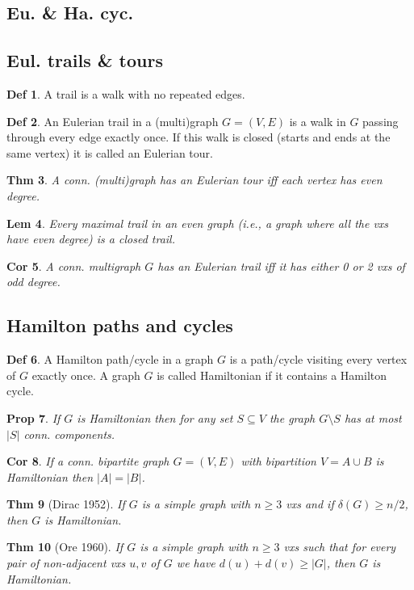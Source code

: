 \documentclass[11pt, fleqn, a4paper, landscape]{article}
\theoremstyle{plain} %
\newtheorem{thm}{Thm}
\newtheorem{lem}[thm]{Lem}
\newtheorem{pro}[thm]{Prop}
\newtheorem{cor}[thm]{Cor}
\theoremstyle{remark} %
\theoremstyle{definition} %
\newtheorem{defi}[thm]{Def}
\begin{document}
\begin{multicols}{5}
\section{Eu. \& Ha. cyc.}
\subsection{Eul. trails \& tours}
\addtocounter{thm}{1}
\begin{defi}
A trail is a walk with no repeated edges.
\end{defi}

\begin{defi}
An Eulerian trail in a (multi)graph $G = (V,E)$ is a walk in $G$ passing through every edge exactly once. If this walk is closed (starts and ends at the same vertex) it is called an Eulerian tour.
\end{defi}
\addtocounter{thm}{1}
\begin{thm}
A conn. (multi)graph has an Eulerian tour iff each vertex has even degree.
\end{thm}

\begin{lem}
Every maximal trail in an even graph (i.e., a graph where all the vxs have even degree) is a closed trail.
\end{lem} 

\begin{cor}
A conn. multigraph $G$ has an Eulerian trail iff it has either 0 or 2 vxs of odd degree.
\end{cor}

\subsection{Hamilton paths and cycles}
\begin{defi}
A Hamilton path/cycle in a graph $G$ is a path/cycle visiting every vertex of $G$ exactly once. A graph $G$ is called Hamiltonian if it contains a Hamilton cycle.
\end{defi}
\addtocounter{thm}{1}
\begin{pro}
If $G$ is Hamiltonian then for any set $S \subseteq V$ the graph $G\setminus S$ has at most $|S|$ conn. components.
\end{pro}

\begin{cor}
If a conn. bipartite graph $G = (V,E)$ with bipartition $V = A\cup B$ is Hamiltonian then $|A|=|B|$.
\end{cor}
\addtocounter{thm}{1}
\begin{thm}[Dirac 1952]
If $G$ is a simple graph with $n \ge 3$ vxs and if $\delta(G) \ge n/2$, then $G$ is Hamiltonian.
\end{thm}
\addtocounter{thm}{1}
\begin{thm}[Ore 1960]
If $G$ is a simple graph with $n\ge 3$ vxs such that for every pair of
non-adjacent vxs $u, v$ of $G$ we have $d(u) + d(v)\ge |G|$, then $G $ is Hamiltonian.
\end{thm}

\end{multicols}
\end{document}
